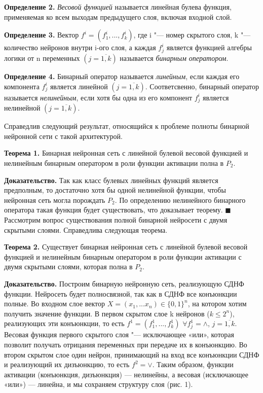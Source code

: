 \documentclass[a4paper, 14pt]{extarticle}
\begin{document}
    \textbf{Определение 2.} \emph{Весовой функцией} называется линейная булева функция, применяемая ко всем выходам предыдущего слоя, включая входной слой.
    
    \textbf{Определение 3.} Вектор $f^i = (f^i_1, ..., f^i_k)$, где i "--- номер скрытого слоя, k "--- количество нейронов внутри i-ого слоя, а каждая $f^i_j$ является функцией алгебры логики от n переменных $(j = \overline{1, k})$ называется \emph{бинарным оператором}.
    
    \textbf{Определение 4.} Бинарный оператор называется \emph{линейным}, если каждая его компонента $f^i_j$ является линейной $(j = \overline{1, k})$. Соответсвенно, бинарный оператор называется \emph{нелинейным}, если хотя бы одна из его компонент $f^i_j$ является нелинейной $(j = \overline{1, k})$.
    
    Справедлив следующий результат, относящийся к проблеме полноты бинарной нейронной сети с такой архитектурой.
    
    \textbf{Теорема 1.}
    Бинарная нейронная сеть с линейной булевой весовой функцией и нелинейным бинарным оператором в роли функции активации полна в $P_2$.
    
    \textbf{Доказательство.}
    Так как класс булевых линейных функций является предполным, то достаточно хотя бы одной нелинейной функции, чтобы нейронная сеть могла порождать $P_2$. По определению нелинейного бинарного оператора такая функция будет существовать, что доказывает теорему. \hfill $\blacksquare$\\
    
    Рассмотрим вопрос существования полной бинарной нейросети с двумя скрытыми слоями. Справедлива следующая теорема.
    
    \textbf{Теорема 2.}
    Существует бинарная нейронная сеть с линейной булевой весовой функцией и нелинейным бинарным оператором в роли функции активации с двумя скрытыми слоями, которая полна в $P_2$.
    
    \textbf{Доказательство.}
    Построим бинарную нейронную сеть, реализующую СДНФ функции. Нейросеть будет полносвязной, так как в СДНФ все конъюнкции полные. Во входном слое вектор $X = (x_1, ... x_n)\in \{0, 1\}^n$, на котором хотим получить значение функции. В первом скрытом слое k нейронов ($k\leqslant2^n$), реализующих эти конъюнкции, то есть $f^1 = (f^1_1, ..., f^1_k)$ $\forall f^1_j = \wedge$, $j = \overline{1, k}$. Весовая функция первого скрытого слоя "--- исключающее «или», которая позволит получать отрицания переменных при передаче их в конъюнкцию. Во втором скрытом слое один нейрон, принимающий на вход все конъюнкции СДНФ и реализующий их дизъюнкцию, то есть $f^2 = \vee$. Таким образом, функции активации (конъюнкция, дизъюнкция) — нелинейны, а весовая (исключающее «или») — линейна, и мы сохраняем структуру слоя (рис. 1).
    
\end{document}
